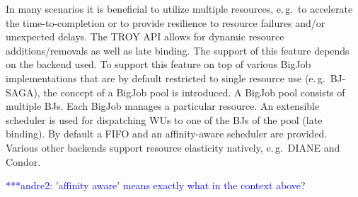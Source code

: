 \documentclass[conference,final]{IEEEtran}
\newcommand{\jhanote}[1]{ {\textcolor{red} { ***shantenu: #1 }}}
\newcommand{\alnote}[1]{ {\textcolor{blue} { ***andre: #1 }}}
\newcommand{\amnote}[1]{ {\textcolor{blue} { ***andre2: #1 }}}
\newcommand{\alnote}[1]{}
\newcommand{\amnote}[1]{}
\newcommand{\jhanote}[1]{}
\begin{document}
In many scenarios it is beneficial to utilize multiple resources, e.\,g.\ to
accelerate the time-to-completion or to provide resilience to resource failures
and/or unexpected delays. The TROY API allows for dynamic resource
additions/removals as well as late binding. The support of this feature depends
on the backend used. To support this feature on top of various BigJob
implementations that are by default restricted to single resource use (e.\,g.\
BJ-SAGA), the concept of a BigJob pool is introduced. A BigJob pool consists of
multiple BJs. Each BigJob manages a particular resource. An extensible
scheduler is used for dispatching WUs to one of the BJs of the pool (late
binding).  By default a FIFO
and an affinity-aware scheduler are provided. Various other backends support
resource elasticity natively, e.\,g.\ DIANE and Condor.

\amnote{'affinity aware' means exactly what in the context above?}



\end{document}
